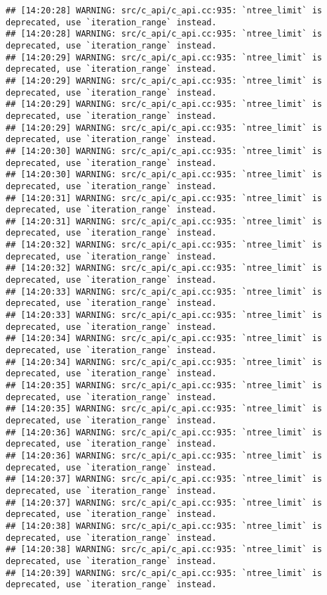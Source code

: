 \documentclass[
]{article}
\begin{document}
\begin{verbatim}
## [14:20:28] WARNING: src/c_api/c_api.cc:935: `ntree_limit` is deprecated, use `iteration_range` instead.
## [14:20:28] WARNING: src/c_api/c_api.cc:935: `ntree_limit` is deprecated, use `iteration_range` instead.
## [14:20:29] WARNING: src/c_api/c_api.cc:935: `ntree_limit` is deprecated, use `iteration_range` instead.
## [14:20:29] WARNING: src/c_api/c_api.cc:935: `ntree_limit` is deprecated, use `iteration_range` instead.
## [14:20:29] WARNING: src/c_api/c_api.cc:935: `ntree_limit` is deprecated, use `iteration_range` instead.
## [14:20:29] WARNING: src/c_api/c_api.cc:935: `ntree_limit` is deprecated, use `iteration_range` instead.
## [14:20:30] WARNING: src/c_api/c_api.cc:935: `ntree_limit` is deprecated, use `iteration_range` instead.
## [14:20:30] WARNING: src/c_api/c_api.cc:935: `ntree_limit` is deprecated, use `iteration_range` instead.
## [14:20:31] WARNING: src/c_api/c_api.cc:935: `ntree_limit` is deprecated, use `iteration_range` instead.
## [14:20:31] WARNING: src/c_api/c_api.cc:935: `ntree_limit` is deprecated, use `iteration_range` instead.
## [14:20:32] WARNING: src/c_api/c_api.cc:935: `ntree_limit` is deprecated, use `iteration_range` instead.
## [14:20:32] WARNING: src/c_api/c_api.cc:935: `ntree_limit` is deprecated, use `iteration_range` instead.
## [14:20:33] WARNING: src/c_api/c_api.cc:935: `ntree_limit` is deprecated, use `iteration_range` instead.
## [14:20:33] WARNING: src/c_api/c_api.cc:935: `ntree_limit` is deprecated, use `iteration_range` instead.
## [14:20:34] WARNING: src/c_api/c_api.cc:935: `ntree_limit` is deprecated, use `iteration_range` instead.
## [14:20:34] WARNING: src/c_api/c_api.cc:935: `ntree_limit` is deprecated, use `iteration_range` instead.
## [14:20:35] WARNING: src/c_api/c_api.cc:935: `ntree_limit` is deprecated, use `iteration_range` instead.
## [14:20:35] WARNING: src/c_api/c_api.cc:935: `ntree_limit` is deprecated, use `iteration_range` instead.
## [14:20:36] WARNING: src/c_api/c_api.cc:935: `ntree_limit` is deprecated, use `iteration_range` instead.
## [14:20:36] WARNING: src/c_api/c_api.cc:935: `ntree_limit` is deprecated, use `iteration_range` instead.
## [14:20:37] WARNING: src/c_api/c_api.cc:935: `ntree_limit` is deprecated, use `iteration_range` instead.
## [14:20:37] WARNING: src/c_api/c_api.cc:935: `ntree_limit` is deprecated, use `iteration_range` instead.
## [14:20:38] WARNING: src/c_api/c_api.cc:935: `ntree_limit` is deprecated, use `iteration_range` instead.
## [14:20:38] WARNING: src/c_api/c_api.cc:935: `ntree_limit` is deprecated, use `iteration_range` instead.
## [14:20:39] WARNING: src/c_api/c_api.cc:935: `ntree_limit` is deprecated, use `iteration_range` instead.

\end{verbatim}
\end{document}
